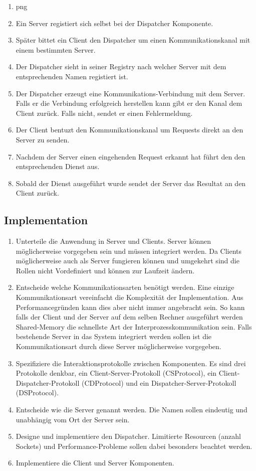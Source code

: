 \begin{enumerate}
	\item png
	\item Ein Server registiert sich selbst bei der Dispatcher Komponente.
	\item Später bittet ein Client den Dispatcher um einen Kommunikationskanal mit einem bestimmten Server.
	\item Der Dispatcher sieht in seiner Registry nach welcher Server mit dem entsprechenden Namen registiert ist.
	\item Der Dispatcher erzeugt eine Kommunikations-Verbindung mit dem Server. Falls er die Verbindung erfolgreich herstellen kann gibt er den Kanal dem Client zurück. Falls nicht, sendet er einen Fehlermeldung.
	\item Der Client bentuzt den Kommunikationskanal um Requests direkt an den Server zu senden.
	\item Nachdem der Server einen eingehenden Request erkannt hat führt den den entsprechenden Dienst aus.
	\item Sobald der Dienst ausgeführt wurde sendet der Server das Resultat an den Client zurück.
\end{enumerate}

\subsection*{Implementation}
\begin{enumerate}
	\item Unterteile die Anwendung in Server und Clients. Server können möglicherweise vorgegeben sein und müssen integriert werden. Da Clients möglicherweise auch als Server fungieren können und umgekehrt sind die Rollen nicht Vordefiniert und können zur Laufzeit ändern.
	\item Entscheide welche Kommunikationsarten benötigt werden. Eine einzige Kommunikationsart vereinfacht die Komplexität der Implementation. Aus Performancegründen kann dies aber nicht immer angebracht sein. So kann falls der Client und der Server auf dem selben Rechner ausgeführt werden Shared-Memory die schnellste Art der Interprozesskommunikation sein. Falls bestehende Server in das System integriert werden sollen ist die Kommunikationsart durch diese Server möglicherweise vorgegeben.
	\item Spezifiziere die Interaktionsprotokolle zwischen Komponenten. Es sind drei Protokolle denkbar, ein Client-Server-Protokoll (CSProtocol), ein Client-Dispatcher-Protokoll (CDProtocol) und ein Dispatcher-Server-Protokoll (DSProtocol).
	\item Entscheide wie die Server genannt werden. Die Namen sollen eindeutig und unabhängig vom Ort der Server sein.
	\item Designe und implementiere den Dispatcher. Limitierte Resourcen (anzahl Sockets) und Performance-Probleme sollen dabei besonders beachtet werden.
	\item Implementiere die Client und Server Komponenten.
\end{enumerate}


